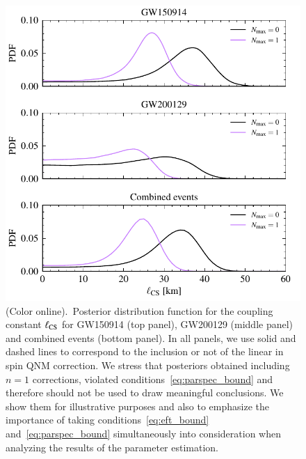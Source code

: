 \documentclass[twocolumn,
               prd,
               aps,
               superscriptaddress,
               tightenlines,
               nofootinbib,
               eqsecnum,
               amsfonts,
               amsmath,
               longbibliography]{revtex4-1}
\begin{document}
\begin{figure}[t]
\includegraphics[width=\columnwidth]{figs/dcs_posteriors_combined.pdf}
\caption{(Color online).~Posterior distribution function for the coupling constant $\ell_{\rm CS}$ for
GW150914 (top panel), GW200129 (middle panel) and combined events (bottom panel).
%
In all panels, we use solid and dashed lines to correspond to the inclusion or not of the linear
in spin QNM correction.
%
We stress that posteriors obtained including $n=1$ corrections, violated conditions~\eqref{eq:parspec_bound}
and therefore should not be used to draw meaningful conclusions. We show them for illustrative purposes
and also to emphasize the importance of taking conditions~\eqref{eq:eft_bound} and~\eqref{eq:parspec_bound}
simultaneously into consideration when analyzing the results of the parameter estimation.
}
\label{fig:dCS_exec_sum}
\end{figure}
\end{document}
